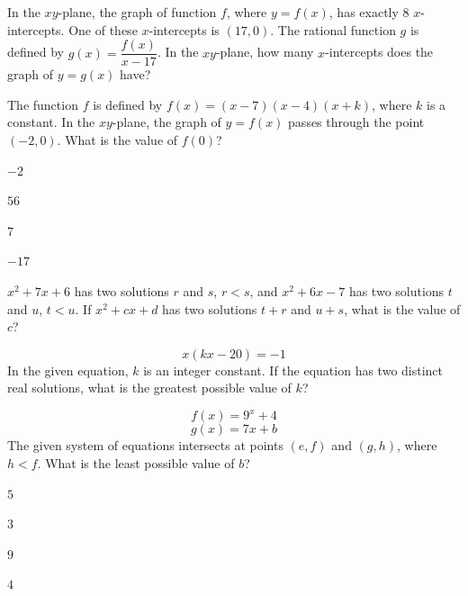 \vfill
\noindent\begin{minipage}{\linewidth}
\par\smallskip
In the $xy$-plane, the graph of function $f$, where $y=f(x)$, has exactly 8 $x$-intercepts. One of these $x$-intercepts is $(17,0)$. The rational function $g$ is defined by $g(x)=\dfrac{f(x)}{x-17}$. In the $xy$-plane, how many $x$-intercepts does the graph of $y=g(x)$ have?
\end{minipage}
\vfill
\noindent\begin{minipage}{\linewidth}
\par\smallskip
The function $f$ is defined by $f(x)=(x-7)(x-4)(x+k)$, where $k$ is a constant. In the $xy$-plane, the graph of $y=f(x)$ passes through the point $(-2,0)$. What is the value of $f(0)$?
\begin{satchoices}
  \item[A)] $-2$
  \item[B)] $56$
  \item[C)] $7$
  \item[D)] $-17$
\end{satchoices}
\end{minipage}
\vfill
\clearpage
\noindent\begin{minipage}{\linewidth}
\par\smallskip
$x^2+7x+6$ has two solutions $r$ and $s$, $r<s$, and $x^2+6x-7$ has two solutions $t$ and $u$, $t<u$. If $x^2+cx+d$ has two solutions $t+r$ and $u+s$, what is the value of $c$?
\end{minipage}
\vfill
\noindent\begin{minipage}{\linewidth}
\par\smallskip
$$x(kx-20)=-1$$ In the given equation, $k$ is an integer constant. If the equation has two distinct real solutions, what is the greatest possible value of $k$?
\end{minipage}
\vfill
\noindent\begin{minipage}{\linewidth}
\par\smallskip
$$f(x)=9^x+4$$ $$g(x)=7x+b$$ The given system of equations intersects at points $(e,f)$ and $(g,h)$, where $h<f$. What is the least possible value of $b$?
\begin{satchoices}
  \item[A)] $5$
  \item[B)] $3$
  \item[C)] $9$
  \item[D)] $4$
\end{satchoices}
\end{minipage}
